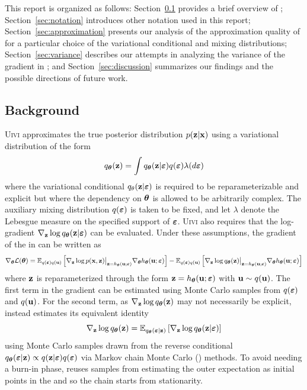 \documentclass[10pt]{article}
\begin{document}
This report is organized as follows: Section~\ref{sec:background} provides a brief overview of \uivi; Section~\ref{sec:notation} introduces other notation used in this report; Section~\ref{sec:approximation} presents our analysis of the approximation quality of \uivi for a particular choice of the variational conditional and mixing distributions; Section~\ref{sec:variance} describes our attempts in analyzing the variance of the \elbo gradient in \uivi; and Section~\ref{sec:discussion} summarizes our findings and the possible directions of future work.


\subsection{Background} \label{sec:background}

\textsc{Uivi} approximates the true posterior distribution $p(\mathbf{z}|\mathbf{x})$ using a variational distribution of the form
\[
q_{\bm{\theta}}(\mathbf{z}) = \int q_{\bm{\theta}}(\mathbf{z}|\bm{\varepsilon})q(\bm{\varepsilon})\lambda(d\bm{\varepsilon})
\]
where the variational conditional $q_\theta(\mathbf{z}|\bm{\varepsilon})$ is required to be reparameterizable and explicit but where the dependency on ${\bm{\theta}}$ is allowed to be arbitrarily complex. The auxiliary mixing distribution $q(\bm{\varepsilon})$ is taken to be fixed, and let $\lambda$ denote the Lebesgue measure on the specified support of $\bm{\varepsilon}$. \textsc{Uivi} also requires that the log-gradient $\nabla_{\mathbf{z}}\log q_{\bm{\theta}}(\mathbf{z}|\bm{\varepsilon})$ can be evaluated. Under these assumptions, the gradient of the \elbo in \uivi can be written as
\[
\nabla_{\bm{\theta}} \mathcal{L}({\bm{\theta}}) = \mathbb{E}_{q(\bm{\varepsilon})q(\mathbf{u})}\left[\nabla_{\mathbf{z}} \log p(\mathbf{x},\mathbf{z})\big|_{\mathbf{z}=h_{\bm{\theta}}(\mathbf{u};\bm{\varepsilon})}\nabla_{\bm{\theta}} h_{\bm{\theta}}(\mathbf{u};\bm{\varepsilon})\right] - \mathbb{E}_{q(\bm{\varepsilon})q(\mathbf{u})}\left[\nabla_{\mathbf{z}} \log q_{\bm{\theta}}(\mathbf{z})\big|_{\mathbf{z}=h_{\bm{\theta}}(\mathbf{u};\bm{\varepsilon})}\nabla_{\bm{\theta}} h_{\bm{\theta}}(\mathbf{u};\bm{\varepsilon})\right]
\]
where $\mathbf{z}$ is reparameterized through the form $\mathbf{z} = h_{\bm{\theta}}(\mathbf{u};\bm{\varepsilon})$ with $\mathbf{u}\sim q(\mathbf{u})$. The first term in the gradient can be estimated using Monte Carlo samples from $q(\bm{\varepsilon})$ and $q(\mathbf{u})$. For the second term, as $\nabla_{\mathbf{z}} \log q_{\bm{\theta}}(\mathbf{z})$ may not necessarily be explicit, \uivi instead estimates its equivalent identity
\[
\nabla_{\mathbf{z}} \log q_{\bm{\theta}}(\mathbf{z}) = \mathbb{E}_{q_{\bm{\theta}}(\bm{\varepsilon}|\mathbf{z})}\left[\nabla_{\mathbf{z}}\log q_{\bm{\theta}}(\mathbf{z}|\bm{\varepsilon})\right]
\]
using Monte Carlo samples drawn from the reverse conditional $q_{\bm{\theta}}(\bm{\varepsilon}|\mathbf{z})\propto q(\mathbf{z}|\bm{\varepsilon})q(\bm{\varepsilon})$ via Markov chain Monte Carlo (\mcmc) methods. To avoid needing a burn-in phase, \uivi reuses samples from estimating the outer expectation as initial points in the \mcmc and so the chain starts from stationarity.
\end{document}

